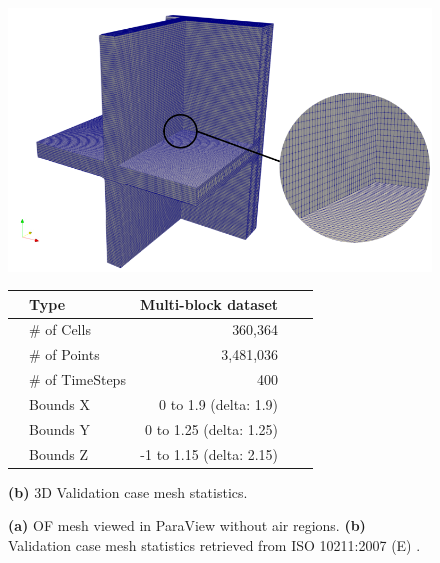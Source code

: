 \begin{figure}[h!]
    \centering
    \begin{minipage}[t]{1\columnwidth}
        \centering
        \includegraphics[width=\linewidth]{Figures/mesh3.png}        
        \vspace{0.5cm}
    \end{minipage}
    
    \begin{minipage}[t]{0.5\columnwidth}
        \centering
        \begin{tabular}{clrrr}    
            \toprule
            & Type       & Multi-block dataset   \\ \midrule
            & \# of Cells & 360,364                      \\
            & \# of Points                        & 3,481,036                  \\
            & \# of TimeSteps                  & 400                        \\
            & Bounds X          & 0 to 1.9 (delta: 1.9) \\
            & Bounds Y          &                     0 to 1.25 (delta: 1.25) \\
            & Bounds Z          &                     -1 to 1.15 (delta: 2.15)    \\  \bottomrule
        \end{tabular}
        \caption*{\textbf{(b)} 3D Validation case mesh statistics.}
        \label{tab:mesh-stats}
    \end{minipage}
    
    \caption[3D Validation Mesh and Mesh Statistics]{\textbf{(a)} \gls{OF} mesh viewed in ParaView without air regions. \textbf{(b)}  Validation case mesh statistics retrieved from ISO 10211:2007 (E) \cite{ISO}.}
    \label{fig:validation-case}
\end{figure}






